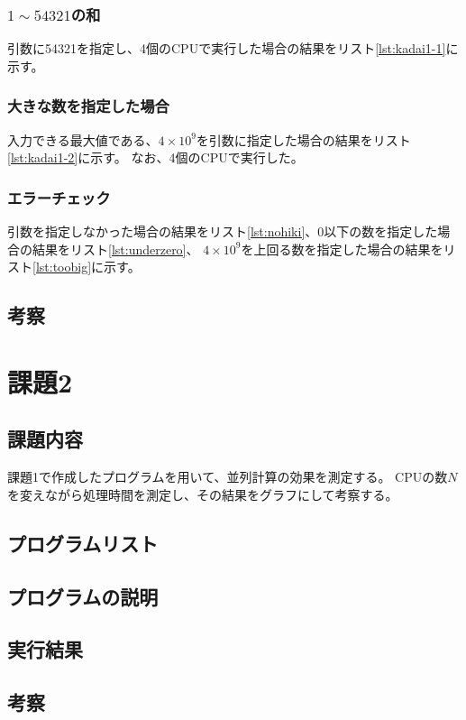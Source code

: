\documentclass[a4j,titlepage]{jsarticle}
\begin{document}
\subsubsection{$1 \sim 54321$の和}
引数に54321を指定し、4個のCPUで実行した場合の結果をリスト\ref{lst:kadai1-1}に示す。

\subsubsection{大きな数を指定した場合}
入力できる最大値である、$4 \times 10^9$を引数に指定した場合の結果をリスト\ref{lst:kadai1-2}に示す。
なお、4個のCPUで実行した。

\subsubsection{エラーチェック}
引数を指定しなかった場合の結果をリスト\ref{lst:nohiki}、0以下の数を指定した場合の結果をリスト\ref{lst:underzero}、
$4 \times 10^9$を上回る数を指定した場合の結果をリスト\ref{lst:toobig}に示す。

\subsection{考察}


\section{課題2}
\subsection{課題内容}
課題1で作成したプログラムを用いて、並列計算の効果を測定する。
CPUの数$N$を変えながら処理時間を測定し、その結果をグラフにして考察する。

\subsection{プログラムリスト}

\subsection{プログラムの説明}

\subsection{実行結果}

\subsection{考察}
\end{document}

